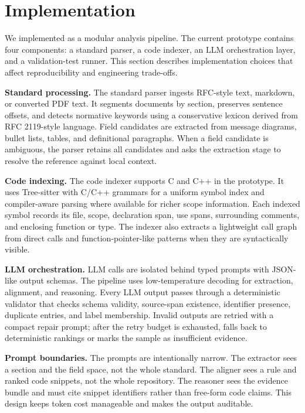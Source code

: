 \section{Implementation}
\label{sec:implementation}

We implemented \tool{} as a modular analysis pipeline. The current prototype
contains four components: a standard parser, a code indexer, an LLM orchestration
layer, and a validation-test runner. This section describes implementation
choices that affect reproducibility and engineering trade-offs.

\textbf{Standard processing.}
The standard parser ingests RFC-style text, markdown, or converted PDF text. It
segments documents by section, preserves sentence offsets, and detects
normative keywords using a conservative lexicon derived from RFC 2119-style
language. Field candidates are extracted from message diagrams, bullet lists,
tables, and definitional paragraphs. When a field candidate is ambiguous, the
parser retains all candidates and asks the extraction stage to resolve the
reference against local context.

\textbf{Code indexing.}
The code indexer supports C and C++ in the prototype. It uses Tree-sitter with
C/C++ grammars for a uniform symbol index and compiler-aware parsing where
available for richer scope information. Each indexed symbol records its file,
scope, declaration span, use spans, surrounding comments, and enclosing
function or type. The indexer also extracts a lightweight call graph from direct
calls and function-pointer-like patterns when they are syntactically visible.

\textbf{LLM orchestration.}
LLM calls are isolated behind typed prompts with JSON-like output schemas. The
pipeline uses low-temperature decoding for extraction, alignment, and
reasoning. Every LLM output passes through a deterministic validator that checks
schema validity, source-span existence, identifier presence, duplicate entries,
and label membership. Invalid outputs are retried with a compact repair prompt;
after the retry budget is exhausted, \tool{} falls back to deterministic
rankings or marks the sample as insufficient evidence.

\textbf{Prompt boundaries.}
The prompts are intentionally narrow. The extractor sees a section and the
field space, not the whole standard. The aligner sees a rule and ranked code
snippets, not the whole repository. The reasoner sees the evidence bundle and
must cite snippet identifiers rather than free-form code claims. This design
keeps token cost manageable and makes the output auditable.

